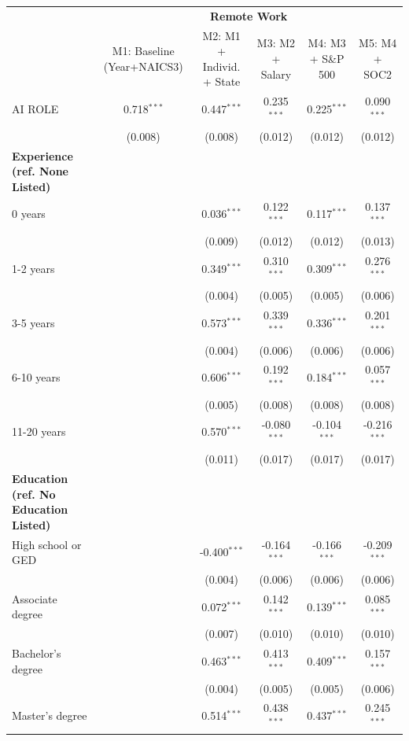 \begin{table}[!htbp]
\centering
\tiny
\begin{tabular}{lccccc}
\toprule
 & \multicolumn{5}{c}{\textbf{Remote Work}} \\
 & M1: Baseline (Year+NAICS3) & M2: M1 + Individ. + State & M3: M2 + Salary & M4: M3 + S\&P 500 & M5: M4 + SOC2 \\
\midrule
AI ROLE & 0.718$^{***}$ & 0.447$^{***}$ & 0.235$^{***}$ & 0.225$^{***}$ & 0.090$^{***}$ \\
 & (0.008) & (0.008) & (0.012) & (0.012) & (0.012) \\
\midrule
\textbf{Experience (ref. None Listed)} &  &  &  &  &  \\
0 years &  & 0.036$^{***}$ & 0.122$^{***}$ & 0.117$^{***}$ & 0.137$^{***}$ \\
 &  & (0.009) & (0.012) & (0.012) & (0.013) \\
1-2 years &  & 0.349$^{***}$ & 0.310$^{***}$ & 0.309$^{***}$ & 0.276$^{***}$ \\
 &  & (0.004) & (0.005) & (0.005) & (0.006) \\
3-5 years &  & 0.573$^{***}$ & 0.339$^{***}$ & 0.336$^{***}$ & 0.201$^{***}$ \\
 &  & (0.004) & (0.006) & (0.006) & (0.006) \\
6-10 years &  & 0.606$^{***}$ & 0.192$^{***}$ & 0.184$^{***}$ & 0.057$^{***}$ \\
 &  & (0.005) & (0.008) & (0.008) & (0.008) \\
11-20 years &  & 0.570$^{***}$ & -0.080$^{***}$ & -0.104$^{***}$ & -0.216$^{***}$ \\
 &  & (0.011) & (0.017) & (0.017) & (0.017) \\
\midrule
\textbf{Education (ref. No Education Listed)} &  &  &  &  &  \\
High school or GED &  & -0.400$^{***}$ & -0.164$^{***}$ & -0.166$^{***}$ & -0.209$^{***}$ \\
 &  & (0.004) & (0.006) & (0.006) & (0.006) \\
Associate degree &  & 0.072$^{***}$ & 0.142$^{***}$ & 0.139$^{***}$ & 0.085$^{***}$ \\
 &  & (0.007) & (0.010) & (0.010) & (0.010) \\
Bachelor's degree &  & 0.463$^{***}$ & 0.413$^{***}$ & 0.409$^{***}$ & 0.157$^{***}$ \\
 &  & (0.004) & (0.005) & (0.005) & (0.006) \\
Master's degree &  & 0.514$^{***}$ & 0.438$^{***}$ & 0.437$^{***}$ & 0.245$^{***}$ \\

\end{tabular}
\end{table}
